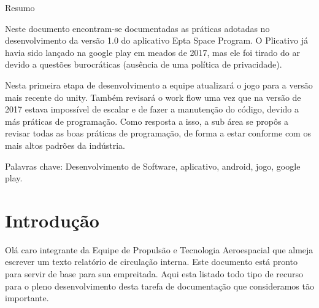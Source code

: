 {
	\thispagestyle{empty}     %
	
	{\LARGE Resumo\\} %
	
    Neste documento encontram-se documentadas as práticas adotadas no desenvolvimento da versão 1.0 do aplicativo Epta Space Program. O Plicativo já havia sido lançado na google play em meados de 2017, mas ele foi tirado do ar devido a questões burocráticas (ausência de uma política de privacidade). 

    Nesta primeira etapa de desenvolvimento a equipe atualizará o jogo para a versão mais recente do unity. Também revisará o work flow uma vez que na versão de 2017 estava impossível de escalar e de fazer a manutenção do código, devido a más práticas de programação. Como resposta a isso, a sub área se propôs a revisar todas as boas práticas de programação, de forma a estar conforme com os mais altos padrões da indústria.  

	\vspace{1cm}
	{\large Palavras chave:} {\small Desenvolvimento de Software, aplicativo, android, jogo, google play.}

}

\tableofcontents          %
\thispagestyle{empty}     %
\listoffigures            %
\thispagestyle{empty}     %
\mainmatter



\chapter{Introdução}%

Olá caro integrante da Equipe de Propulsão e Tecnologia Aeroespacial que almeja escrever um texto relatório de circulação interna. Este documento está pronto para servir de base para sua empreitada. Aqui esta listado todo tipo de recurso para o pleno desenvolvimento desta tarefa de documentação que consideramos tão importante.

